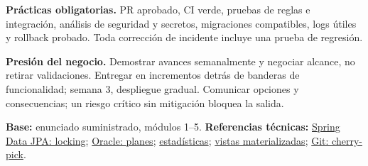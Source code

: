 \documentclass[11pt,a4paper]{article}
\newcommand{\tagline}[1]{\textbf{#1}\enspace}
\begin{document}
\tagline{Prácticas obligatorias.} PR aprobado, CI verde, pruebas de reglas e integración, análisis de seguridad y secretos, migraciones compatibles, logs útiles y rollback probado. Toda corrección de incidente incluye una prueba de regresión.

\tagline{Presión del negocio.} Demostrar avances semanalmente y negociar alcance, no retirar validaciones. Entregar en incrementos detrás de banderas de funcionalidad; semana 3, despliegue gradual. Comunicar opciones y consecuencias; un riesgo crítico sin mitigación bloquea la salida.

\vfill
{\footnotesize\color{muted}\textbf{Base:} enunciado suministrado, módulos 1--5. \textbf{Referencias técnicas:}
\href{https://docs.spring.io/spring-data/jpa/reference/jpa/locking.html}{Spring Data JPA: locking};
\href{https://docs.oracle.com/en/database/oracle/oracle-database/19/arpls/DBMS_XPLAN.html}{Oracle: planes};
\href{https://docs.oracle.com/en/database/oracle/oracle-database/19/tgsql/optimizer-statistics-concepts.html}{estadísticas};
\href{https://docs.oracle.com/en/database/oracle/oracle-database/19/dwhsg/refreshing-materialized-views.html}{vistas materializadas};
\href{https://git-scm.com/docs/git-cherry-pick}{Git: cherry-pick}.}
\end{document}
